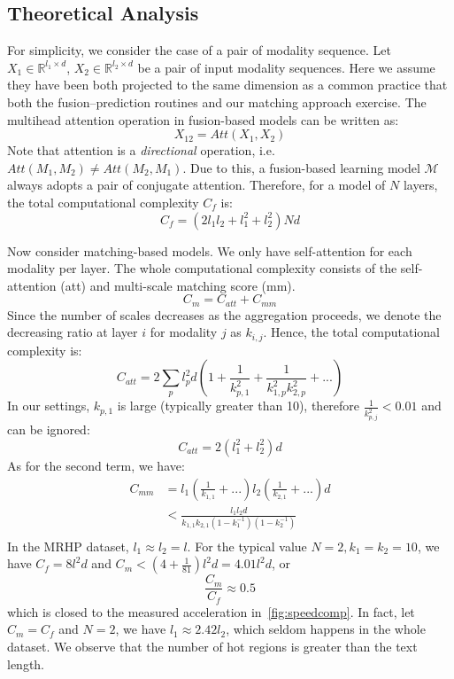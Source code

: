\subsection{Theoretical Analysis}
For simplicity, we consider the case of a pair of modality sequence.
Let $X_1\in \mathbb{R}^{l_1\times d}$, $X_2\in \mathbb{R}^{l_2\times d}$ be a pair of input modality sequences. Here we assume they have been both projected to the same dimension as a common practice that both the fusion--prediction routines and our matching approach exercise.
The multihead attention operation in fusion-based models can be written as:
\begin{equation}
    X_{12} = Att(X_1,X_2)
\end{equation}
Note that attention is a \textit{directional} operation, i.e. $Att(M_1,M_2)\neq Att(M_2,M_1)$. 
Due to this, a fusion-based learning model $\mathcal{M}$ always adopts a pair of conjugate attention. Therefore, for a model of $N$ layers, the total computational complexity $C_f$ is:
\begin{equation}
    C_{f}=(2l_1l_2+l_1^2+l_2^2)Nd
\end{equation}

Now consider matching-based models. 
We only have self-attention for each modality per layer. 
The whole computational complexity consists of the self-attention (att) and multi-scale matching score (mm).
\begin{equation}
    C_{m} = C_{att} + C_{mm}
\end{equation}
Since the number of scales decreases as the aggregation proceeds, we denote the decreasing ratio at layer $i$ for modality $j$ as $k_{i,j}$. Hence, the total computational complexity is:
\begin{equation}
    C_{att}=2\sum_pl_p^2d\left(1+\frac{1}{k_{p,1}^2}+\frac{1}{k_{1,p}^2k_{2,p}^2}+...\right) 
\end{equation}
In our settings, $k_{p,1}$ is large (typically greater than 10), therefore $\frac{1}{k_{p,j}^2} < 0.01$ and can be ignored:
\begin{equation}
    C_{att} = 2(l_1^2+l_2^2)d
\end{equation}
As for the second term, we have:
\begin{equation}
\begin{split}
    C_{mm} &=  l_1\left(\frac{1}{k_{1,1}}+...\right)l_2\left(\frac{1}{k_{2,1}}+...\right)d \\
    &< \frac{l_1l_2d}{k_{1,1}k_{2,1}(1-k_1^{-1})(1-k_2^{-1})} \\
\end{split}
\end{equation}
In the MRHP dataset, $l_1\approx l_2 = l$. 
For the typical value $N=2, k_1=k_2=10$, we have $C_f=8l^2d$ and $C_m < (4+\frac{1}{81})l^2d=4.01l^2d$, or 
\begin{equation}
    \frac{C_m}{C_f}\approx0.5
\end{equation}
which is closed to the measured acceleration in~\ref{fig:speedcomp}. In fact, let $C_m=C_f$ and $N=2$, we have $l_1\approx 2.42 l_2$, which seldom happens in the whole dataset. We observe that the number of hot regions is greater than the text length.
    

